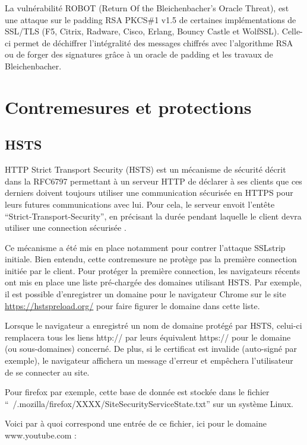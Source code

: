 \vspace{1em}

La vulnérabilité ROBOT (Return Of the Bleichenbacher's Oracle Threat), est une attaque sur le padding RSA PKCS\#1 v1.5 de certaines implémentations de SSL/TLS (F5, Citrix, Radware, Cisco, Erlang, Bouncy Castle et WolfSSL). Celle-ci permet de déchiffrer l'intégralité des messages chiffrés avec l'algorithme RSA ou de forger des signatures grâce à un oracle de padding et les travaux de Bleichenbacher\cite{robot}.


\section{Contremesures et protections}

\subsection{HSTS}

HTTP Strict Transport Security (HSTS) est un mécanisme de sécurité décrit dans la RFC6797 permettant à un serveur HTTP de déclarer à ses clients que ces derniers doivent toujours utiliser une communication sécurisée en HTTPS pour leurs futures communications avec lui. Pour cela, le serveur envoit l'entête ``Strict-Transport-Security'', en précisant la durée pendant laquelle le client devra utiliser une connection sécurisée \cite{hsts}.

Ce mécanisme a été mis en place notamment pour contrer l'attaque SSLstrip initiale. Bien entendu, cette contremesure ne protège pas la première connection initiée par le client. Pour protéger la première connection, les navigateurs récents ont mis en place une liste pré-chargée des domaines utilisant HSTS. Par exemple, il est possible d'enregistrer un domaine pour le navigateur Chrome sur le site \url{https://hstspreload.org/} pour faire figurer le domaine dans cette liste.

Lorsque le navigateur a enregistré un nom de domaine protégé par HSTS, celui-ci remplacera tous les liens http:// par leurs équivalent https:// pour le domaine (ou sous-domaines) concerné. De plus, si le certificat est invalide (auto-signé par exemple), le navigateur affichera un message d'erreur et empêchera l'utilisateur de se connecter au site.

Pour firefox par exemple, cette base de donnée est stockée dans le fichier ``~/.mozilla/firefox/XXXX/SiteSecurityServiceState.txt'' sur un système Linux.

Voici par à quoi correspond une entrée de ce fichier, ici pour le domaine www.youtube.com :

